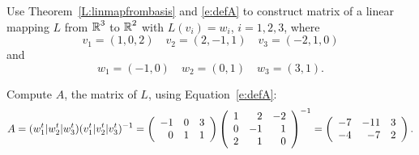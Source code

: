 \documentclass{ximera}
\begin{document}
\begin{exercise} \label{c7.2.1}
Use Theorem~\ref{L:linmapfrombasis} and \eqref{e:defA} to 
construct matrix of a linear mapping $L$ from $\mbox{$\Bbb{R}$}^3$ to $\mbox{$\Bbb{R}$}^2$ with $L(v_i)=w_i$, $i=1,2,3$, where
\[
v_1=(1,0,2)\quad v_2=(2,-1,1) \quad v_3=(-2,1,0)
\]
and
\[
w_1=(-1,0) \quad w_2=(0,1) \quad w_3=(3,1).
\]

\begin{solution}

\soln
Compute $A$, the matrix of $L$, using Equation~\eqref{e:defA}:
\[ A = (w_1^t|w_2^t|w_3^t)(v_1^t|v_2^t|v_3^t)^{-1} =
\left(\begin{array}{rrr} -1 & 0 & 3 \\ 0 & 1 & 1 \end{array}\right)
\left(\begin{array}{rrr} 1 & 2 & -2 \\ 0 & -1 & 1 \\ 2 & 1 & 0\end{array}\right)^{-1} =
\left(\begin{array}{rrr} -7 & -11 & 3 \\ -4 & -7 & 2
\end{array}\right). \]

\end{solution}
\end{exercise}
\end{document}
